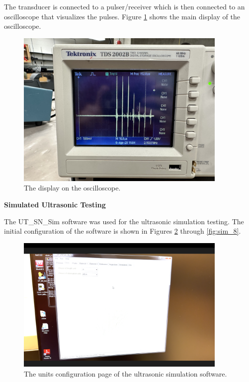 \documentclass[12 pt]{report}
\begin{document}
The transducer is connected to a pulser/receiver which is then connected to an oscilloscope that visualizes the pulses. Figure \ref{fig:oscilloscope} shows the main display of the oscilloscope.

\begin{figure}[htbp]
	\centering
	\includegraphics[width=4in]{images/oscilloscope}
	\caption{The display on the oscilloscope.}
	\label{fig:oscilloscope}
\end{figure}

\textbf{Simulated Ultrasonic Testing}

The UT\_SN\_Sim software was used for the ultrasonic simulation testing. The initial configuration of the software is shown in Figures \ref{fig:sim_1} through \ref{fig:sim_8}.

\begin{figure}[htbp]
	\centering
	\includegraphics[width=4in]{images/sim_1}
	\caption{The units configuration page of the ultrasonic simulation software.}
	\label{fig:sim_1}
\end{figure}
\end{document}
